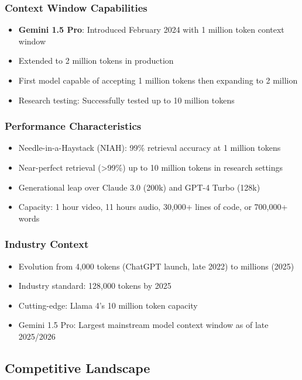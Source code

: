 \documentclass[11pt,letterpaper]{article}
\begin{document}
\subsubsection{Context Window Capabilities}
\begin{itemize}[leftmargin=*]
    \item \textbf{Gemini 1.5 Pro}: Introduced February 2024 with 1 million token context window
    \item Extended to 2 million tokens in production
    \item First model capable of accepting 1 million tokens then expanding to 2 million
    \item Research testing: Successfully tested up to 10 million tokens
\end{itemize}

\subsubsection{Performance Characteristics}
\begin{itemize}[leftmargin=*]
    \item Needle-in-a-Haystack (NIAH): 99\% retrieval accuracy at 1 million tokens
    \item Near-perfect retrieval (>99\%) up to 10 million tokens in research settings
    \item Generational leap over Claude 3.0 (200k) and GPT-4 Turbo (128k)
    \item Capacity: 1 hour video, 11 hours audio, 30,000+ lines of code, or 700,000+ words
\end{itemize}

\subsubsection{Industry Context}
\begin{itemize}[leftmargin=*]
    \item Evolution from 4,000 tokens (ChatGPT launch, late 2022) to millions (2025)
    \item Industry standard: 128,000 tokens by 2025
    \item Cutting-edge: Llama 4's 10 million token capacity
    \item Gemini 1.5 Pro: Largest mainstream model context window as of late 2025/2026
\end{itemize}

\subsection{Competitive Landscape}
\end{document}
